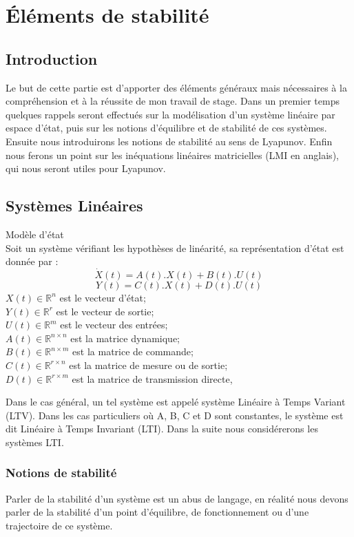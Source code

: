 \section{Éléments de stabilité}
\subsection*{Introduction}
Le but de cette partie est d'apporter des éléments généraux mais nécessaires à la compréhension et à la réussite de mon travail de stage. Dans un premier temps quelques rappels seront effectués sur la modélisation d'un système linéaire par espace d'état, puis sur les notions d'équilibre et de stabilité de ces systèmes. Ensuite nous introduirons les notions de stabilité au sens de Lyapunov. Enfin nous ferons un point sur les inéquations linéaires matricielles (LMI en anglais), qui nous seront utiles pour Lyapunov. %

\subsection{Systèmes Linéaires}

\begin{definition} Modèle d'état\\
\label{defmodeleEtat}
Soit un système vérifiant les hypothèses de linéarité, sa représentation d'état est donnée par : 
\[\dot{X}(t) = A(t).X(t) + B(t).U(t)\]
\[Y(t) = C(t).X(t) + D(t).U(t)\]
$X(t) \in \mathbb{R}^{n}$ est le vecteur d'état;\\
$Y(t) \in \mathbb{R}^{r}$ est le vecteur de sortie;\\
$U(t) \in \mathbb{R}^{m}$ est le vecteur des entrées;\\
$A(t) \in \mathbb{R}^{n\times n}$ est la matrice dynamique;\\
$B(t) \in \mathbb{R}^{n\times m}$ est la matrice de commande;\\
$C(t) \in \mathbb{R}^{r\times n}$ est la matrice de mesure ou de sortie;\\
$D(t) \in \mathbb{R}^{r\times m}$ est la matrice de transmission directe,
\end{definition}
Dans le cas général, un tel système est appelé système Linéaire à Temps Variant (LTV). Dans les cas particuliers où A, B, C et D sont constantes, le système est dit Linéaire à Temps Invariant (LTI).
Dans la suite nous considérerons les systèmes LTI.

\subsubsection{Notions de stabilité}
Parler de la stabilité d'un système est un abus de langage, en réalité nous devons parler de la stabilité d'un point d'équilibre, de fonctionnement ou d'une trajectoire de ce système.

